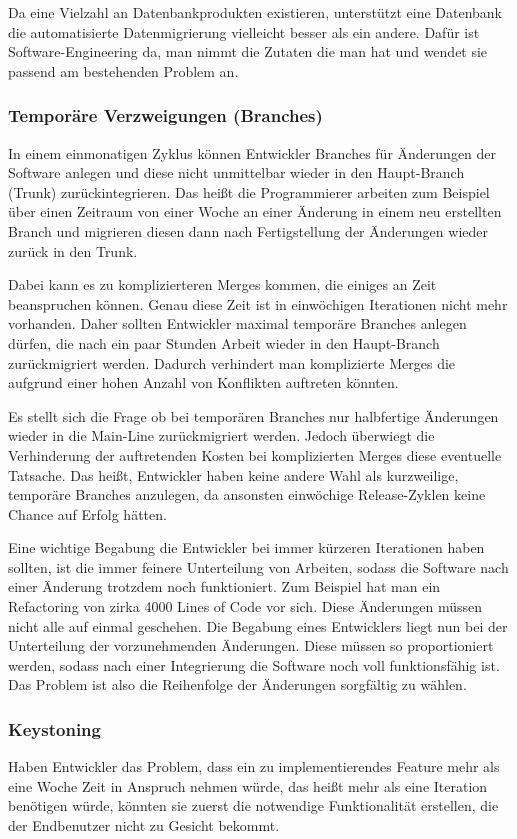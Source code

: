 Da eine Vielzahl an Datenbankprodukten existieren, unterstützt eine Datenbank die automatisierte Datenmigrierung vielleicht besser als ein andere. Dafür ist Software-Engineering da, man nimmt die Zutaten die man hat und wendet sie passend am bestehenden Problem an.

\subsubsection{Temporäre Verzweigungen (Branches)}
In einem einmonatigen Zyklus können Entwickler Branches für Änderungen der Software anlegen und diese nicht unmittelbar wieder in den Haupt-Branch (Trunk) zurückintegrieren. Das heißt die Programmierer arbeiten zum Beispiel über einen Zeitraum von einer Woche an einer Änderung in einem neu erstellten Branch und migrieren diesen dann nach Fertigstellung der Änderungen wieder zurück in den Trunk. 

Dabei kann es zu komplizierteren Merges kommen, die einiges an Zeit beanspruchen können. Genau diese Zeit ist in einwöchigen Iterationen nicht mehr vorhanden. Daher sollten Entwickler maximal temporäre Branches anlegen dürfen, die nach ein paar Stunden Arbeit wieder in den Haupt-Branch zurückmigriert werden. Dadurch verhindert man komplizierte Merges die aufgrund einer hohen Anzahl von Konflikten auftreten könnten. 

Es stellt sich die Frage ob bei temporären Branches nur halbfertige Änderungen wieder in die Main-Line zurückmigriert werden. Jedoch überwiegt die Verhinderung der auftretenden Kosten bei komplizierten Merges diese eventuelle Tatsache. Das heißt, Entwickler haben keine andere Wahl als kurzweilige, temporäre Branches anzulegen, da ansonsten einwöchige Release-Zyklen keine Chance auf Erfolg hätten. 

Eine wichtige Begabung die Entwickler bei immer kürzeren Iterationen haben sollten, ist die immer feinere Unterteilung von Arbeiten, sodass die Software nach einer Änderung trotzdem noch funktioniert. Zum Beispiel hat man ein Refactoring von zirka 4000 Lines of Code vor sich. Diese Änderungen müssen nicht alle auf einmal geschehen. Die Begabung eines Entwicklers liegt nun bei der Unterteilung der vorzunehmenden Änderungen. Diese müssen so proportioniert werden, sodass nach einer Integrierung die Software noch voll funktionsfähig ist. Das Problem ist also die Reihenfolge der Änderungen sorgfältig zu wählen.

\subsubsection{Keystoning}
Haben Entwickler das Problem, dass ein zu implementierendes Feature mehr als eine Woche Zeit in Anspruch nehmen würde, das heißt mehr als eine Iteration benötigen würde, könnten sie zuerst die notwendige Funktionalität erstellen, die der Endbenutzer nicht zu Gesicht bekommt. 

